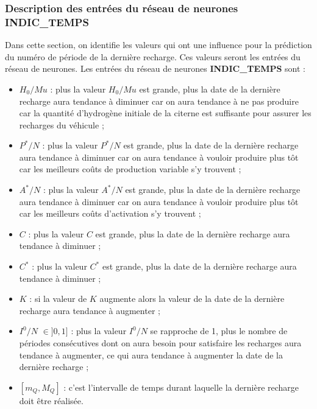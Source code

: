 \subsubsection{Description des entrées du réseau de neurones \textbf{INDIC\_TEMPS}}
Dans cette section, on identifie les valeurs qui ont une influence pour la prédiction du numéro de période de la dernière recharge. Ces valeurs seront les entrées du réseau de neurones. Les entrées du réseau de neurones \textbf{INDIC\_TEMPS} sont :
\begin{itemize}[label=$\square$]
\item $H_0/Mu$ : plus la valeur $H_0/Mu$ est grande, plus la date de la dernière recharge aura tendance à diminuer car on aura tendance à ne pas produire car la quantité d'hydrogène initiale de la citerne est suffisante pour assurer les recharges du véhicule ;
\item $P^*/N$ : plus la valeur $P^*/N$  est grande, plus la date de la dernière recharge aura tendance à diminuer car on aura tendance à vouloir produire plus tôt car les meilleurs coûts de production variable s'y trouvent ;
\item $A^*/N$ : plus la valeur $A^*/N$ est grande, plus la date de la dernière recharge aura tendance à diminuer car on aura tendance à vouloir produire plus tôt car les meilleurs coûts d'activation s'y trouvent ;
\item $C$ : plus la valeur $C$ est grande, plus la date de la dernière recharge aura tendance à diminuer ;
\item $C^*$ : plus la valeur $C^*$ est grande, plus la date de la dernière recharge aura tendance à diminuer ;
\item $K$ : si la valeur de $K$ augmente alors la valeur de la date de la dernière recharge aura tendance à augmenter ;
\item $I^0/N$ $\in ]0,1]$ : plus la valeur $I^0/N$ se rapproche de 1, plus le nombre de périodes consécutives dont on aura besoin pour satisfaire les recharges aura tendance à augmenter, ce qui aura tendance à augmenter la date de la dernière recharge ; 
\item $[m_Q, M_Q]$ : c'est l'intervalle de temps durant laquelle la dernière recharge doit être réalisée.
\end{itemize}
